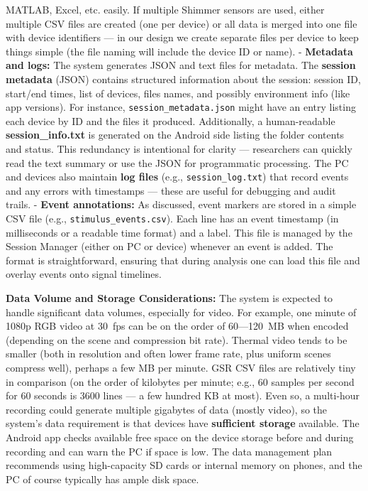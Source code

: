 MATLAB, Excel, etc. easily. If multiple Shimmer sensors are used, either
multiple CSV files are created (one per device) or all data is merged
into one file with device identifiers --- in our design we create
separate files per device to keep things simple (the file naming will
include the device ID or name). - \textbf{Metadata and logs:} The system
generates JSON and text files for metadata. The \textbf{session metadata}
(JSON) contains structured information about the session: session ID,
start/end times, list of devices, files names, and possibly environment
info (like app versions). For instance, \texttt{session_metadata.json} might
have an entry listing each device by ID and the files it
produced\cite{ref67}\cite{ref68}.
Additionally, a human-readable \textbf{session_info.txt} is generated on the
Android side listing the folder contents and
status\cite{ref69}\cite{ref4}.
This redundancy is intentional for clarity --- researchers can quickly
read the text summary or use the JSON for programmatic processing. The
PC and devices also maintain \textbf{log files} (e.g., \texttt{session_log.txt})
that record events and any errors with timestamps --- these are useful
for debugging and audit trails. - \textbf{Event annotations:} As discussed,
event markers are stored in a simple CSV file (e.g.,
\texttt{stimulus_events.csv}). Each line has an event timestamp (in
milliseconds or a readable time format) and a label. This file is
managed by the Session Manager (either on PC or device) whenever an
event is
added\cite{ref27}.
The format is straightforward, ensuring that during analysis one can
load this file and overlay events onto signal timelines.

\textbf{Data Volume and Storage Considerations:} The system is expected to
handle significant data volumes, especially for video. For example, one
minute of 1080p RGB video at 30 fps can be on the order of 60---120 MB
when encoded (depending on the scene and compression bit rate). Thermal
video tends to be smaller (both in resolution and often lower frame
rate, plus uniform scenes compress well), perhaps a few MB per minute.
GSR CSV files are relatively tiny in comparison (on the order of
kilobytes per minute; e.g., 60 samples per second for 60 seconds is 3600
lines --- a few hundred KB at most). Even so, a multi-hour recording
could generate multiple gigabytes of data (mostly video), so the
system's data requirement is that devices have \textbf{sufficient storage}
available. The Android app checks available free space on the device
storage before and during
recording\cite{ref70}
and can warn the PC if space is low. The data management plan recommends
using high-capacity SD cards or internal memory on phones, and the PC of
course typically has ample disk space.

